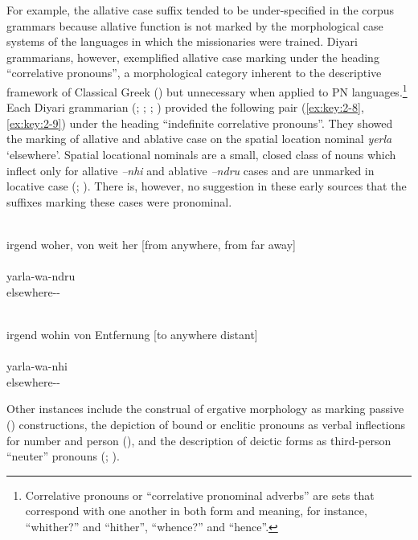For example, the allative case suffix tended to be under-specified in the corpus grammars because allative function is not marked by the morphological case systems of the languages in which the missionaries were trained. Diyari grammarians, however, exemplified allative case marking under the heading “correlative pronouns'', a morphological category inherent to the descriptive framework of Classical Greek () but unnecessary when applied to PN languages.\footnote{Correlative pronouns or “correlative pronominal adverbs” are sets that correspond with one another in both form and meaning, for instance, “whither?” and “hither'', “whence?” and “hence''. }  Each Diyari grammarian (\citealt{koch_untitled_1868}; \citealt[8]{schoknecht_grammar_1947}; \citealt[28]{flierl_dieri_1880}; \citealt[18]{reuther_three_1981}) provided the following pair (\ref{ex:key:2-8}, \ref{ex:key:2-9}) under the heading “indefinite correlative pronouns''. They showed the marking of allative and ablative case on the spatial location nominal \textit{yerla} `elsewhere'. Spatial locational nominals are a small, closed class of nouns which inflect only for allative \textit{–nhi} and ablative \textit{–ndru} cases and are unmarked in locative case (\citealt[41]{austin_grammar_2013}; \citealt[54--56]{austin_grammar_2013}). There is, however, no suggestion in these early sources that the suffixes marking these cases were pronominal.

\ea\label{ex:key:2-8}
\\
{irgend woher, von weit her [from anywhere, from far away]} \\
\glt \citep[no pag.]{koch_untitled_1868} \\
\gll yarla-wa-ndru\\
elsewhere--\\
\z

\ea\label{ex:key:2-9}
\\
{irgend wohin von Entfernung [to anywhere distant]} \\
\glt \citep[no pag.]{koch_untitled_1868} \\
\gll yarla-wa-nhi\\
elsewhere--\\
\z

Other instances include the construal of ergative morphology as marking passive () constructions, the depiction of bound or enclitic pronouns as verbal inflections for number and person (), and the description of deictic forms as third-person “neuter” pronouns (\citealt{threlkeld_australian_1834}; ).

